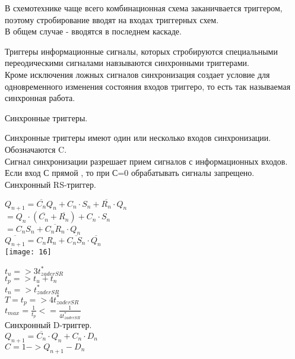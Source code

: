 В схемотехнике чаще всего комбинационная схема заканичвается триггером, поэтому стробирование вводят на входах триггерных схем.\\
В общем случае - вводятся в последнем каскаде.

Триггеры информационные сигналы, которых стробируются специальными переодическими сигналами навзываются синхронными триггерами.\\
Кроме исключения ложных сигналов синхронизация создает условие для одновременного изменения состояния входов триггеро,
то есть так называемая синхронная работа.


Синхронные триггеры.

Синхронные триггеры имеют один или несколько входов синхронизации. Обозначаются C. \\
Сигнал синхронизации разрешает прием сигналов с информационных входов. \\
Если вход С прямой , то при С=0 обрабатывать сигналы запрещено.\\

Синхронный RS-триггер.

$Q_{n+1} = \overline{C_n}Q_n + C_n \cdot S_n + \overline{R_n} \cdot Q_n $\\
$= Q_n \cdot (\overline{C_n} + \overline{R_n} ) + C_n \cdot S_n$\\
$ = C_n S_n + \overline{C_n R_n} \cdot Q_n$\\
$\overline{Q_{n+1}} = C_n R_n + \overline{C_n S_n} \cdot \overline{Q_n}$\\

\texttt{[image: 16]}



$t_{u} => 3t^*_{zaderSR}$\\
$t_{p} => t_u + t_n $\\
$t_{n} => t^*_{zaderSR}$\\
$T = t_p => 4t^*_{zaderSR} $\\
$t_{max} = \frac{1}{t_p} <= \frac{1}{ 4t^*_{zaderSR}} $\\

Синхронный D-триггер.\\

$Q_{n+1} = \overline{C_n} \cdot Q_n + C_n \cdot D_n $\\
$C = 1  -> Q_{n+1} - D_n $\\


